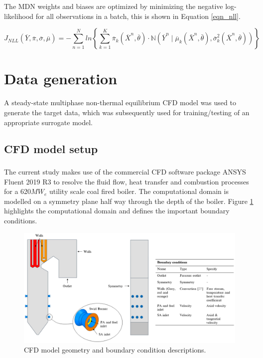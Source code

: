 \documentclass[a4paper,fleqn]{cas-sc}
\begin{document}
The MDN weights and biases are optimized by minimizing the negative log-likelihood for all observations in a batch, this is shown in Equation \ref{eqn_nll}.

\begin{equation}\label{eqn_nll}
J_{NLL}(\overline{Y},\overline{\pi},\overline{\sigma},\overline{\mu})=-\sum^N_{n=1}ln\left\{\sum^K_{k=1}\overline{\pi}_k(\overline{X}^n,\overline{\theta})\cdot \mathbb{N}(\overline{Y}^n\mid\overline{\mu}_k(\bar{X}^n,\bar{\theta}),\overline{\sigma}^2_k(\overline{X}^n,\overline{\theta})) \right\}
\end{equation}


\section{Data generation}
A steady-state multiphase non-thermal equilibrium CFD model was used to generate the target data, which was subsequently used for training/testing of an appropriate surrogate model.

\subsection{CFD model setup}
The current study makes use of the commercial CFD software package ANSYS\textsuperscript{\textregistered} Fluent 2019 R3 to resolve the fluid flow, heat transfer and combustion processes for a 620$MW_e$ utility scale coal fired boiler. The computational domain is modelled on a symmetry plane half way through the depth of the boiler. Figure \ref{fig_cfd_geom_bc} highlights the computational domain and defines the important boundary conditions.\\ 

\begin{figure}[h!]
	\centering
		\includegraphics[scale=0.4]{CFD_GEOMETRY}
	  \caption{CFD model geometry and boundary condition descriptions.}\label{fig_cfd_geom_bc}
\end{figure}
\end{document}
